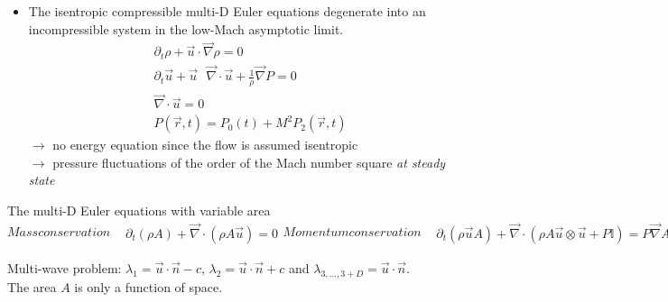 \documentclass[xcolor=dvipsnames,10pt]{beamer}
\renewcommand{\div}{\vec{\nabla}\! \cdot \!}
\newcommand{\grad}{\vec{\nabla}}
\newcommand{\tcr}[1]{\textcolor{red}{#1}}
\begin{document}
\begin{frame}
\begin{block}{}
\begin{itemize}
\setlength{\itemsep}{10pt}
\item The isentropic compressible multi-D Euler equations degenerate into an incompressible system in the low-Mach asymptotic limit.
\begin{align}
&\partial_t \rho + \vec{u} \cdot \grad \rho = 0 \nonumber \\
&\partial_t \vec{u} + \vec{u}\text{ } \div \vec{u} + \frac{1}{\rho}\grad P = 0 \nonumber \\
& \div \vec{u} = 0 \nonumber \\
&P( \vec{r},t) = P_0(t) + M^2 P_2(\vec{r},t)\nonumber
\end{align}
$\to$ no energy equation since the flow is assumed isentropic \\
$\to$ pressure fluctuations of the order of the Mach number square \emph{at steady state}%
\end{itemize}
\end{block}
\end{frame}
\begin{frame}
\begin{block}{The multi-D Euler equations with variable area}
\begin{subequations}
Mass conservation
\begin{align}
&\partial_t ( \rho A ) + \div \left( \rho A \vec{u} \right) = 0 \nonumber
\end{align}
Momentum conservation
\begin{align}
&\partial_t ( \rho \vec{u} A ) + \div \left( \rho A \vec{u} \otimes \vec{u} + P \mathbb{I} \right) = P \grad A \nonumber
\end{align}
Energy conservation
\begin{align}
&\partial_t ( \rho E A ) + \div \left[ \vec{u} \left( \rho E + P \right) A \right] = 0 \nonumber
\end{align}
Equation of state
\begin{align}
& P = eos \left( \rho, e \right) \nonumber 
\end{align}
\end{subequations}
\end{block}
Multi-wave problem: $\lambda_1 = \vec{u} \cdot \vec{n} - c $, $\lambda_2 = \vec{u} \cdot \vec{n} + c $ and $\lambda_{3, \dots, 3+D} = \vec{u} \cdot \vec{n}$. \\
The area $A$ is only a function of space.
\end{frame}
\end{document}
